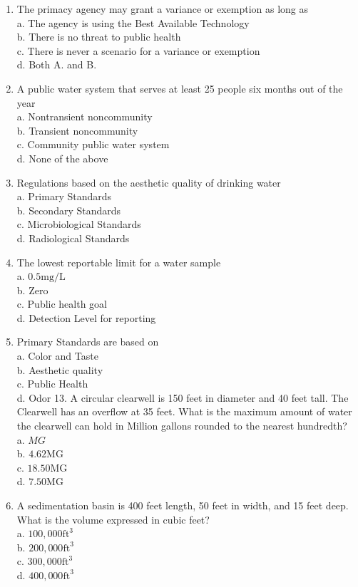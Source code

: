 \documentclass[10pt]{article}
\begin{document}
\begin{enumerate}
  \item The primacy agency may grant a variance or exemption as long as\\
a. The agency is using the Best Available Technology\\
b. There is no threat to public health\\
c. There is never a scenario for a variance or exemption\\
d. Both A. and B.

  \item A public water system that serves at least 25 people six months out of the year\\
a. Nontransient noncommunity\\
b. Transient noncommunity\\
c. Community public water system\\
d. None of the above

  \item Regulations based on the aesthetic quality of drinking water\\
a. Primary Standards\\
b. Secondary Standards\\
c. Microbiological Standards\\
d. Radiological Standards

  \item The lowest reportable limit for a water sample\\
a. $0.5 \mathrm{mg} / \mathrm{L}$\\
b. Zero\\
c. Public health goal\\
d. Detection Level for reporting

  \item Primary Standards are based on\\
a. Color and Taste\\
b. Aesthetic quality\\
c. Public Health\\
d. Odor 13. A circular clearwell is 150 feet in diameter and 40 feet tall. The Clearwell has an overflow at 35 feet. What is the maximum amount of water the clearwell can hold in Million gallons rounded to the nearest hundredth?\\
a. $M G$\\
b. $4.62 \mathrm{MG}$\\
c. $18.50 \mathrm{MG}$\\
d. $7.50 \mathrm{MG}$

  \item A sedimentation basin is 400 feet length, 50 feet in width, and 15 feet deep. What is the volume expressed in cubic feet?\\
a. $100,000 \mathrm{ft}^{3}$\\
b. $200,000 \mathrm{ft}^{3}$\\
c. $300,000 \mathrm{ft}^{3}$\\
d. $400,000 \mathrm{ft}^{3}$


\end{enumerate}
\end{document}
